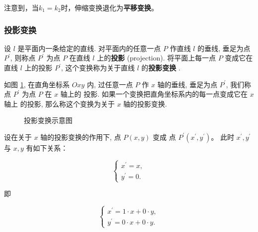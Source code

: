 \documentclass[lang=cn,newtx,10pt,scheme=chinese]{elegantbook}
\begin{document}
注意到，当$k_1=k_2$时，伸缩变换退化为\textcolor{third}{\bf 平移变换}。


\subsubsection{投影变换}
\label{subsubsec:投影变换}

设 $l$ 是平面内一条给定的直线. 对平面内的任意一点 $P$ 作直线 $l$ 的垂线, 垂足为点 $P^{\prime}$, 则称点 $P^{\prime}$ 为点 $P$ 在直线 $l$ 上的\textcolor{third}{\bf 投影} (projection). 将平面上每一点 $P$ 变成它在直线 $l$ 上的投影 $P^{\prime}$, 这个变换称为关于直线 $l$ 的\textcolor{third}{\bf 投影变换}  .

如图 \ref{fig:投影变换}, 在直角坐标系 $O x y$ 内, 过任意一点 $P$ 作 $x$ 轴的垂线, 垂足为点 $P^{\prime}$, 我们称点 $P^{\prime}$ 为点 $P$ 在 $x$ 轴上的  投影. 如果一个变换把直角坐标系内的每一点变成它在 $x$ 轴上 的投影, 那么称这个变换为关于 $x$ 轴的投影变换.

\begin{figure}[h]
\centering
{}
\caption{投影变换示意图\label{fig:投影变换}}
\end{figure}

设在关于 $x$ 轴的投影变换的作用下, 点 $P(x, y)$ 变成 点 $P^{\prime}\left(x^{\prime}, y^{\prime}\right)$。
此时 $x^{\prime}, y^{\prime}$ 与 $x, y$ 有如下关系：

$$
\left\{\begin{array}{l}
x^{\prime}=x, \\
y^{\prime}=0 .
\end{array}\right.
$$

即

$$
\left\{\begin{array}{l}
x^{\prime}= 1 \cdot x + 0 \cdot y, \\
y^{\prime}= 0 \cdot x + 0 \cdot y.
\end{array}\right.
$$
\end{document}
